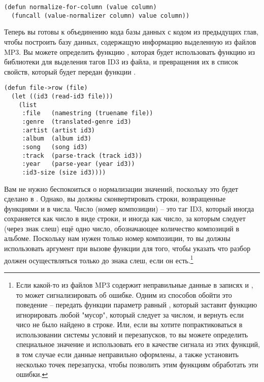 \begin{lstlisting}
(defun normalize-for-column (value column)
  (funcall (value-normalizer column) value column))
\end{lstlisting}

Теперь вы готовы к объединению кода базы данных с кодом из предыдущих глав, чтобы
построить базу данных, содержащую информацию выделенную из файлов MP3.  Вы можете
определить функцию , которая будет использовать функцию  из
библиотеки  для выделения тагов ID3 из файла, и превращения их в список
свойств, который будет передан функции .

\begin{lstlisting}
(defun file->row (file)
  (let ((id3 (read-id3 file)))
    (list
     :file   (namestring (truename file))
     :genre  (translated-genre id3)
     :artist (artist id3)
     :album  (album id3)
     :song   (song id3)
     :track  (parse-track (track id3))
     :year   (parse-year (year id3))
     :id3-size (size id3))))
\end{lstlisting}

Вам не нужно беспокоиться о нормализации значений, поскольку это будет сделано в
.  Однако, вы должны сконвертировать строки, возвращенные функциями
 и  в числа.  Число  (номер композиции) -- это таг ID3,
который иногда сохраняется как число в виде строки, и иногда как число, за которым следует
(через знак слеш) ещё одно число, обозначающее количество композиций в альбоме.  Поскольку
нам нужен только номер композиции, то вы должны использовать аргумент  при
вызове функции  для того, чтобы указать что разбор должен
осуществляться только до знака слеш, если он есть.\footnote{Если какой-то из файлов MP3
  содержит неправильные данные в записях  и , то
   может сигнализировать об ошибке. Одним из способов обойти это
  поведение -- передать функции  параметр  равный
  , который заставит функцию игнорировать любой "мусор", который следует за
  числом, и вернуть  если чисо не было найдено в строке.  Или, если вы хотите
  попрактиковаться в использовании системы условий и перезапусков, то вы можете определить
  специальное значение  и использовать его в качестве сигнала из этих функций,
  в том случае если данные неправильно оформлены, а также установить несколько точек
  перезапуска, чтобы позволить этим функциям обработать эти ошибки.}

